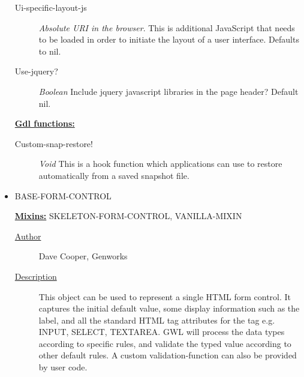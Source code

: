 \documentclass [11pt]{book}
\begin{document}
\begin{itemize}
\begin{description}
\item [Ui-specific-layout-js]
\emph{Absolute URI in the browser}.
This is additional JavaScript that needs to be loaded in order to initiate the layout of a user
interface. Defaults to nil.


\item [Use-jquery?]
\emph{Boolean} Include jquery javascript libraries in the page header?
Default nil.


\end{description}






\textbf{
\underline{Gdl functions:}}

\begin{description}

\item [Custom-snap-restore!]
\emph{Void} This is a hook function which applications can use to restore automatically
from a saved snapshot file.


\end{description}







\item {}BASE-FORM-CONTROL


\textbf{
\underline{Mixins:}} SKELETON-FORM-CONTROL, VANILLA-MIXIN





\begin{description}

\item [
\underline{Author}]


Dave Cooper, Genworks



\item [
\underline{Description}]


This object can be used to represent a single HTML form control. It captures the 
initial default value, some display information such as the label, and all the standard HTML tag attributes
for the tag e.g. INPUT, SELECT, TEXTAREA. GWL will process the data types according to specific rules,
and validate the typed value according to other default rules. A custom validation-function can also 
be provided by user code. 


\end{description}
\end{itemize}
\end{document}
